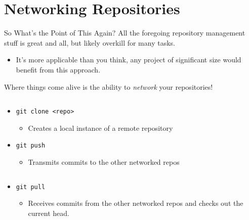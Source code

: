 \documentclass[11pt]{beamer}
\begin{document}
\section[Collaboration]{Networking Repositories}
\begin{frame}{So What's the Point of This Again?}
All the foregoing repository management stuff is great and all, but likely overkill for many tasks.
\begin{itemize}
\item It's more applicable than you think, any project of significant size would benefit from this approach.  
\end{itemize}
Where things come alive is the ability to \emph{network} your repositories! 
\begin{columns}
\begin{column}{0.53\textwidth}
\begin{itemize}
\item \texttt{git clone <repo>}
\begin{itemize}
\item Creates a local instance of a remote repository
\end{itemize}
\item \texttt{git push}
\begin{itemize}
\item Transmits commits to the other networked repos
\end{itemize}
\end{itemize}
\end{column}
\begin{column}{0.29\textwidth}
 \\ 
\end{column}
\end{columns}
\begin{itemize}
\item \texttt{git pull}
\begin{itemize}
\item Receives commits from the other networked repos and checks out the current head.
\end{itemize}
\end{itemize}
\end{frame}
\end{document}
